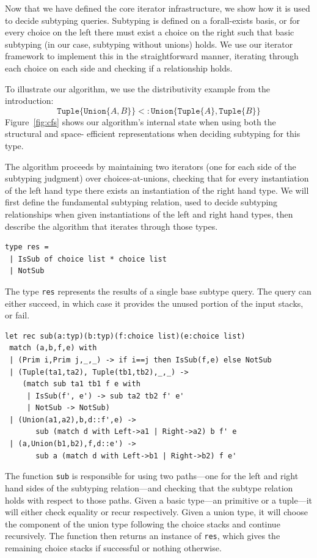 \documentclass[a4paper,english]{lipics-v2019}
\newcommand{\xt}[1]{\texttt{#1}}
\newcommand{\union}[2]{\xt{Union\{}#1,#2\xt{\}}}
\newcommand{\tuple}[1]{\xt{Tuple\{}#1\xt{\}}}
\begin{document}
Now that we have defined the core iterator infrastructure, we show how it
is used to decide subtyping queries. Subtyping is defined on a forall-exists
basis, or for every choice on the left there must exist a choice on the right
such that basic subtyping (in our case, subtyping without unions) holds. We
use our iterator framework to implement this in the straightforward manner, 
iterating through each choice on each side and checking if a relationship holds.

To illustrate our algorithm, we use the  distributivity example from the
introduction: $$\tuple{\union{A}{B}} <: \union{\tuple{A}}{\tuple{B}}$$
Figure~\ref{fig:cfs} shows our algorithm's internal state when using  both the
structural and space- efficient representations when deciding subtyping for
this type.

The algorithm proceeds by maintaining two iterators (one for each side of
the subtyping judgment) over choices-at-unions, checking that for every
instantiation of the left hand type there exists an instantiation of the
right hand type. We will first define the fundamental subtyping relation,
used to decide subtyping relationships when given instantiations of the left
and right hand types, then describe the algorithm that iterates through
those types.

\begin{lstlisting}
type res =
 | IsSub of choice list * choice list
 | NotSub
\end{lstlisting}

The type \verb|res| represents the results of a single base subtype
query. The query can either succeed, in which case it provides the unused
portion of the input stacks, or fail.

\begin{lstlisting}
let rec sub(a:typ)(b:typ)(f:choice list)(e:choice list)
 match (a,b,f,e) with
 | (Prim i,Prim j,_,_) -> if i==j then IsSub(f,e) else NotSub
 | (Tuple(ta1,ta2), Tuple(tb1,tb2),_,_) ->
    (match sub ta1 tb1 f e with
     | IsSub(f', e') -> sub ta2 tb2 f' e'
     | NotSub -> NotSub)
 | (Union(a1,a2),b,d::f',e) -> 
       sub (match d with Left->a1 | Right->a2) b f' e
 | (a,Union(b1,b2),f,d::e') -> 
       sub a (match d with Left->b1 | Right->b2) f e'
\end{lstlisting}


The function \verb|sub| is responsible for using two
paths---one for the left and right hand sides of the subtyping
relation---and checking that the subtype relation holds with respect
to those paths. Given a basic type---an primitive or a tuple---it will
either check equality or recur respectively. Given a union type, it
will choose the component of the union type following the choice
stacks and continue recursively. The function then returns an instance
of \verb|res|, which gives the remaining choice stacks if
successful or nothing otherwise.
\end{document}
